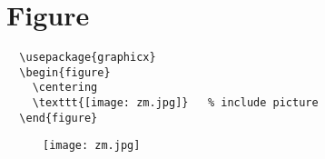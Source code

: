 \chapter{Figure}

\begin{lstlisting}
  \usepackage{graphicx}
  \begin{figure}
    \centering
    \texttt{[image: zm.jpg]}   % include picture
  \end{figure}
\end{lstlisting}


\begin{figure}
  \centering
  \texttt{[image: zm.jpg]}   %
\end{figure}




